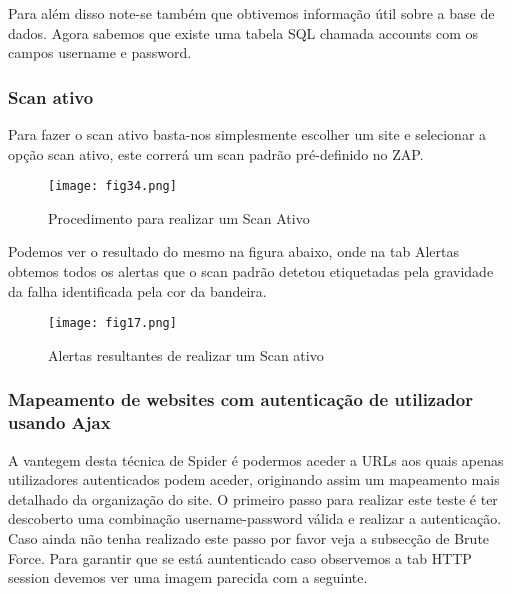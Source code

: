Para além disso note-se também que obtivemos informação útil sobre a base de dados. Agora sabemos que existe uma tabela SQL chamada accounts com os campos username e password.



\subsubsection{Scan ativo}

Para fazer o scan ativo basta-nos simplesmente escolher um site e selecionar a opção scan ativo, este correrá um scan padrão pré-definido no ZAP.

\begin{figure}[H]

  \centering

  \texttt{[image: fig34.png]}

  \caption{Procedimento para realizar um Scan Ativo}

\end{figure}


 Podemos ver o resultado do mesmo na figura abaixo, onde na tab Alertas obtemos todos os alertas que o scan padrão detetou etiquetadas pela gravidade da falha identificada pela cor da bandeira.

\begin{figure}[H]

  \centering

  \texttt{[image: fig17.png]}

  \caption{Alertas resultantes de realizar um Scan ativo}

\end{figure}




\subsubsection{Mapeamento de websites com autenticação de utilizador usando Ajax}

A vantegem desta técnica de Spider é podermos aceder a URLs aos quais apenas utilizadores autenticados podem aceder, originando assim um mapeamento mais detalhado da organização do site.\newline
O primeiro passo para realizar este teste é ter descoberto uma combinação username-password válida e realizar a autenticação. Caso ainda não tenha realizado este passo por favor veja a subsecção de Brute Force.\newline
Para garantir que se está auntenticado caso observemos a tab HTTP session devemos ver uma imagem parecida com a seguinte.\newline


